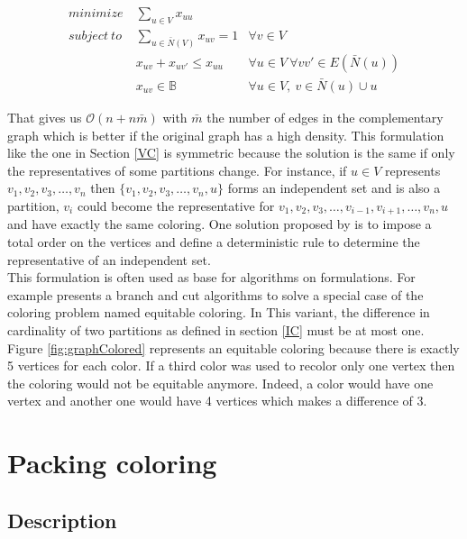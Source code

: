\begin{eqnarray}
minimize\ & \displaystyle\sum_{u \in V}  x_{uu}& \\
subject\ to & \displaystyle\sum_{u \in \bar{N}(V)} x_{uv} = 1 & \forall v \in V \\
& x_{uv} + x_{uv\prime} \leq x_{uu} & \forall u \in V\ \forall vv\prime \in E(\bar{N}(u)) \\
&  x_{uv} \in \mathbb{B} &  \forall u \in V,\ v \in \bar{N}(u)\cup u
\end{eqnarray}

That gives us $\mathcal{O}(n + n\bar{m})$ with $\bar{m}$ the number of edges in the complementary graph which is better if the original graph has a high density. This formulation like the one in Section \ref{VC} is symmetric because the solution is the same if only the representatives of some partitions change. For instance, if $u \in V$ represents $v_1,v_2,v_3,\dots,v_n$ then $\{v_1,v_2,v_3,\dots,v_n,u\}$ forms an independent set and is also a partition, $v_i$ could become the representative for $v_1,v_2,v_3,\dots,v_{i-1},v_{i+1},\dots,v_n,u$ and have exactly the same coloring. One solution proposed by \cite{AsymetricRepresentation} is to impose a total order on the vertices and define a deterministic rule to determine the representative of an independent set. \\

This formulation is often used as base for algorithms on formulations. For example \cite{BranchAndCut} presents a branch and cut algorithms to solve a special case of the coloring problem named equitable  coloring. In This variant, the difference in cardinality of two partitions as defined in section \ref{IC} must be at most one. Figure \ref{fig:graphColored} represents an equitable coloring because there is exactly 5 vertices for each color. If a third color was used to recolor only one vertex then the coloring would not be equitable anymore. Indeed, a color would have one vertex and another one would have 4 vertices which makes a difference of 3. \\


\chapter{Packing coloring}
\label{sec:packing coloring}

\section{Description}

